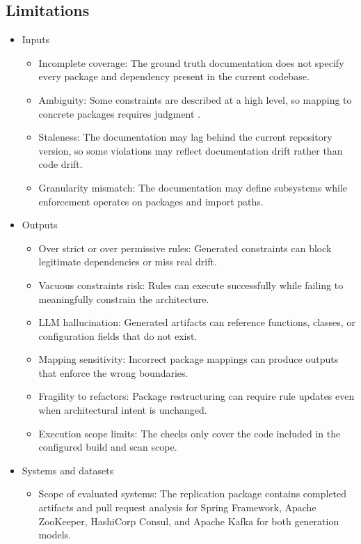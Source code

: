 \documentclass[sigconf,screen]{acmart}
\begin{document}
\subsection{Limitations}
\begin{itemize}
    \item Inputs
    \begin{itemize}
        \item Incomplete coverage: The ground truth documentation does not specify every package and dependency present in the current codebase.
        \item Ambiguity: Some constraints are described at a high level, so mapping to concrete packages requires judgment \cite{su2026evaluating}.
        \item Staleness: The documentation may lag behind the current repository version, so some violations may reflect documentation drift rather than code drift.
        \item Granularity mismatch: The documentation may define subsystems while enforcement operates on packages and import paths.
    \end{itemize}
    \item Outputs
    \begin{itemize}
        \item Over strict or over permissive rules: Generated constraints can block legitimate dependencies or miss real drift.
        \item Vacuous constraints risk: Rules can execute successfully while failing to meaningfully constrain the architecture.
        \item LLM hallucination: Generated artifacts can reference functions, classes, or configuration fields that do not exist.
        \item Mapping sensitivity: Incorrect package mappings can produce outputs that enforce the wrong boundaries.
        \item Fragility to refactors: Package restructuring can require rule updates even when architectural intent is unchanged.
        \item Execution scope limits: The checks only cover the code included in the configured build and scan scope.
    \end{itemize}
    \item Systems and datasets
    \begin{itemize}
        \item Scope of evaluated systems: The replication package contains completed artifacts and pull request analysis for Spring Framework, Apache ZooKeeper, HashiCorp Consul, and Apache Kafka for both generation models.

\end{itemize}
\end{itemize}
\end{document}
